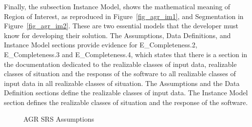 \begin{itemize}
\hspace{\enumerateparindent}Finally, the subsection Instance Model, shows the mathematical meaning of Region of Interest, as reproduced in Figure~\ref{fig_agr_im1}, and Segmentation in Figure~\ref{fig_agr_im2}. These are two essential models that the developer must know for developing their solution. The Assumptions, Data Definitions, and Instance Model sections provide evidence for E\_Completeness.2, E\_Completeness.3 and E\_Completeness.4, which states that there is a section in the documentation dedicated to the realizable classes of input data, realizable classes of situation and the responss of the software to all realizable classes of input data in all realizable classes of situation. The Assumptions and the Data Definition sections define the realizable classes of input data. The Instance Model section defines the realizable classes of situation and the response of the software.

\begin{figure}[H]
    \centering
    \caption[AGR SRS Assumptions]{AGR SRS Assumptions}
    \label{fig_agr_srs_a}
\end{figure}


\end{itemize}
